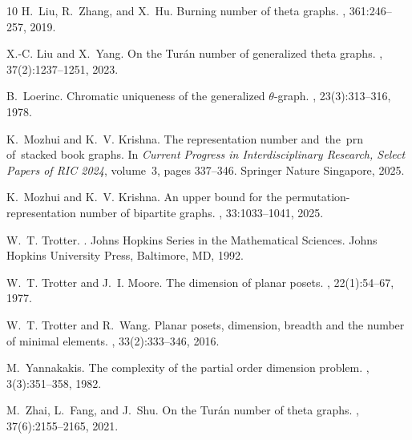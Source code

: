 \documentclass{llncs}
\begin{document}
\begin{thebibliography}{10}
	H.~Liu, R.~Zhang, and X.~Hu.
	\newblock Burning number of theta graphs.
	, 361:246--257, 2019.
	
	X.-C. Liu and X.~Yang.
	\newblock On the {T}ur\'an number of generalized theta graphs.
	, 37(2):1237--1251, 2023.
	
	B.~Loerinc.
	\newblock Chromatic uniqueness of the generalized {$\theta $}-graph.
	, 23(3):313--316, 1978.
	
	K.~Mozhui and K.~V. Krishna.
	\newblock The representation number and the prn of stacked book graphs.
	\newblock In {\em Current Progress in Interdisciplinary Research, Select Papers
		of RIC 2024}, volume~3, pages 337--346. Springer Nature Singapore, 2025.
	
	K.~Mozhui and K.~V. Krishna.
	\newblock An upper bound for the permutation-representation number of bipartite
	graphs.
	, 33:1033--1041, 2025.
	
	W.~T. Trotter.
	.
	\newblock Johns Hopkins Series in the Mathematical Sciences. Johns Hopkins
	University Press, Baltimore, MD, 1992.
	
	W.~T. Trotter and J.~I. Moore.
	\newblock The dimension of planar posets.
	, 22(1):54--67, 1977.
	
	W.~T. Trotter and R.~Wang.
	\newblock Planar posets, dimension, breadth and the number of minimal elements.
	, 33(2):333--346, 2016.
	
	M.~Yannakakis.
	\newblock The complexity of the partial order dimension problem.
	, 3(3):351--358, 1982.
	
	M.~Zhai, L.~Fang, and J.~Shu.
	\newblock On the {T}ur\'an number of theta graphs.
	, 37(6):2155--2165, 2021.
	
\end{thebibliography}



%
%


\appendix
\end{document}
